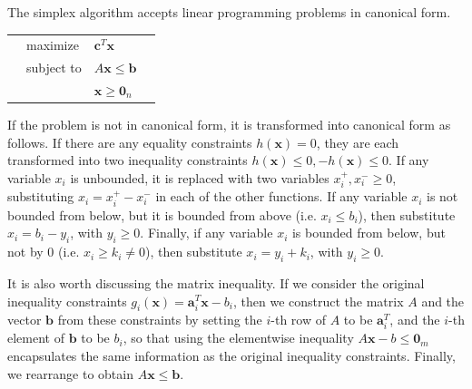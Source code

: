 \documentclass[10pt]{article}
\renewcommand{\vec}[1]{\mathbf{#1}}
\newcommand{\x}{\vec{x}}
\newcommand{\vz}[1]{\vec{0}_{#1}}
\renewcommand{\a}{\vec{a}}
\renewcommand{\b}{\vec{b}}
\renewcommand{\c}{\vec{c}}
\begin{document}
The simplex algorithm accepts linear programming problems in canonical form.\cite{murty}\\
\begin{tabularx}{\textwidth}{X l l X}
	& maximize		& $\c^T\x$ & \\
	& subject to	& $A\x\leq \b$ & \\
	& 				& $\x\geq\vz{n}$ & 
\end{tabularx}
If the problem is not in canonical form, it is transformed into canonical form as follows.\cite{murty} If there are any equality constraints $h(\x)=0$, they are each transformed into two inequality constraints $h(\x)\leq 0, -h(\x)\leq 0$. If any variable $x_i$ is unbounded, it is replaced with two variables $x_i^+, x_i^-\geq 0$, substituting $x_i = x_i^+ - x_i^-$ in each of the other functions. If any variable $x_i$ is not bounded from below, but it is bounded from above (i.e. $x_i \leq b_i$), then substitute $x_i = b_i - y_i$, with $y_i\geq 0$. Finally, if any variable $x_i$ is bounded from below, but not by 0 (i.e. $x_i \geq k_i \neq 0$), then substitute $x_i = y_i+k_i$, with $y_i\geq 0$.

It is also worth discussing the matrix inequality. If we consider the original inequality constraints $g_i(\x) = \a_i^T\x - b_i$, then we construct the matrix $A$ and the vector $\b$ from these constraints by setting the $i$-th row of $A$ to be $\a_i^T$, and the $i$-th element of $\b$ to be $b_i$, so that using the elementwise inequality $A\x-b\leq\vz{m}$ encapsulates the same information as the original inequality constraints. Finally, we rearrange to obtain $A\x\leq\b$.
\end{document}
